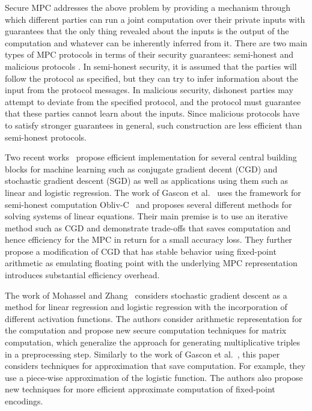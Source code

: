\documentclass{article}
\begin{document}
Secure MPC addresses the above problem by providing a mechanism through which different parties can run a joint computation over their private inputs with guarantees that the only thing
revealed about the inputs is the output of the computation and whatever can be inherently inferred from it.
There are two main types of MPC protocols in terms of their security guarantees: semi-honest and malicious protocols \cite{Goldreich:2004:FCV:975541, cryptoeprint:2010:551}. In semi-honest security, it is assumed that the parties will follow the protocol as specified, but they can try to infer information about the input from the protocol messages. In malicious security, dishonest parties may attempt to deviate from the specified protocol, and the protocol must guarantee that these parties cannot learn about the inputs. Since malicious protocols have to satisfy stronger guarantees in general, such construction are less efficient than semi-honest protocols.

Two recent works~\cite{GSB0DZE17, MZ17} propose efficient implementation for several central building blocks for machine learning such as conjugate gradient decent (CGD) and stochastic gradient descent (SGD) as well as applications using them such as linear and logistic regression. The work of Gascon et al.~\cite{GSB0DZE17} uses the framework for semi-honest computation Obliv-C~\cite{cryptoeprint:2015:1153} and proposes
several different methods for solving systems of linear equations. Their main premise is to use an iterative method such as CGD and demonstrate trade-offs that saves computation and hence efficiency for the MPC in
return for a small accuracy loss. They further propose a modification of CGD that has stable behavior using fixed-point arithmetic as emulating floating point with the underlying MPC representation introduces substantial
efficiency overhead.

The work of Mohassel and Zhang~\cite{MZ17} considers stochastic gradient descent as a method for linear regression and logistic regression with the incorporation of different activation functions. The authors consider
arithmetic representation for the computation and propose new secure computation techniques for matrix computation, which generalize the approach for generating multiplicative triples in a preprocessing step.
 Similarly to the work of Gascon et al.~\cite{GSB0DZE17}, this paper considers techniques for approximation that save computation. For example, they use a piece-wise approximation of the logistic function. The authors
 also propose new techniques for more efficient approximate computation of fixed-point encodings.
\end{document}
